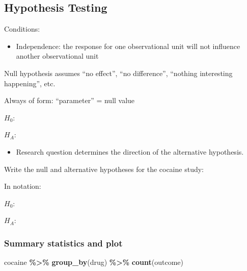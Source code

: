 \documentclass[
]{report}
\newenvironment{Shaded}{\begin{snugshade}}{\end{snugshade}}
\newcommand{\FunctionTok}[1]{\textcolor[rgb]{0.13,0.29,0.53}{\textbf{#1}}}
\newcommand{\NormalTok}[1]{#1}
\newcommand{\SpecialCharTok}[1]{\textcolor[rgb]{0.81,0.36,0.00}{\textbf{#1}}}
\providecommand{\tightlist}{%
  \setlength{\itemsep}{0pt}\setlength{\parskip}{0pt}}
\newcommand{\rgi}{\hspace{24pt}}  %
\begin{document}

\newpage

\subsection*{Hypothesis Testing}\label{hypothesis-testing-1}

Conditions:

\begin{itemize}
\tightlist
\item
  Independence: the response for one observational unit will not influence another observational unit
\end{itemize}

Null hypothesis assumes ``no effect'', ``no difference'', ``nothing interesting happening'', etc.

\rgi Always of form: ``parameter'' = null value

\(H_0:\)

\vspace{0.2in}

\(H_A:\)

\vspace{0.2in}

\begin{itemize}
\tightlist
\item
  Research question determines the direction of the alternative hypothesis.
\end{itemize}

Write the null and alternative hypotheses for the cocaine study:

In notation:

\(H_0:\)

\vspace{0.2in}

\(H_A:\)

\vspace{0.2in}

\subsubsection*{Summary statistics and plot}\label{summary-statistics-and-plot}

\begin{Shaded}
\begin{Highlighting}[]
\NormalTok{cocaine }\SpecialCharTok{\%\textgreater{}\%} \FunctionTok{group\_by}\NormalTok{(drug) }\SpecialCharTok{\%\textgreater{}\%} \FunctionTok{count}\NormalTok{(outcome)}
\end{Highlighting}
\end{Shaded}
\end{document}
